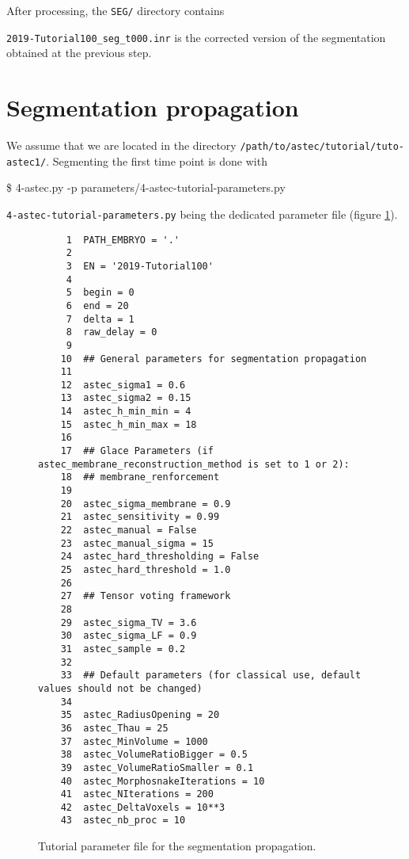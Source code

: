 After processing, the \texttt{SEG/} directory contains

\mbox{}
\mbox{}

\texttt{2019-Tutorial100\_seg\_t000.inr} is the corrected version of
the segmentation obtained at the previous step.



\section{Segmentation propagation}
\label{sec:tutorial:segmentation:propagation}

We assume that we are located in the directory
\texttt{/path/to/astec/tutorial/tuto-astec1/}. Segmenting the first
time point is
done with
\begin{code}{0.8}
  \$ 4-astec.py -p parameters/4-astec-tutorial-parameters.py  
\end{code}
\texttt{4-astec-tutorial-parameters.py} being the
dedicated parameter file  (figure \ref{fig:tutorial:parameter:astec}).

\begin{figure}
\begin{framed}
\begin{verbatim}
     1	PATH_EMBRYO = '.'
     2	
     3	EN = '2019-Tutorial100'
     4	
     5	begin = 0
     6	end = 20
     7	delta = 1
     8	raw_delay = 0
     9	
    10	## General parameters for segmentation propagation
    11	
    12	astec_sigma1 = 0.6  		
    13	astec_sigma2 = 0.15 		
    14	astec_h_min_min = 4
    15	astec_h_min_max = 18   		
    16	
    17	## Glace Parameters (if astec_membrane_reconstruction_method is set to 1 or 2):
    18	## membrane_renforcement
    19	
    20	astec_sigma_membrane = 0.9
    21	astec_sensitivity = 0.99  
    22	astec_manual = False     	
    23	astec_manual_sigma = 15   
    24	astec_hard_thresholding = False 
    25	astec_hard_threshold = 1.0      
    26	
    27	## Tensor voting framework
    28	
    29	astec_sigma_TV = 3.6    
    30	astec_sigma_LF = 0.9    
    31	astec_sample = 0.2      
    32	
    33	## Default parameters (for classical use, default values should not be changed)
    34	
    35	astec_RadiusOpening = 20 		
    36	astec_Thau = 25 				
    37	astec_MinVolume = 1000 		
    38	astec_VolumeRatioBigger = 0.5 
    39	astec_VolumeRatioSmaller = 0.1
    40	astec_MorphosnakeIterations = 10 
    41	astec_NIterations = 200 		
    42	astec_DeltaVoxels = 10**3  	
    43	astec_nb_proc = 10
\end{verbatim}
\end{framed}
\caption{\label{fig:tutorial:parameter:astec} Tutorial
  parameter file for the segmentation propagation.}
\end{figure}

